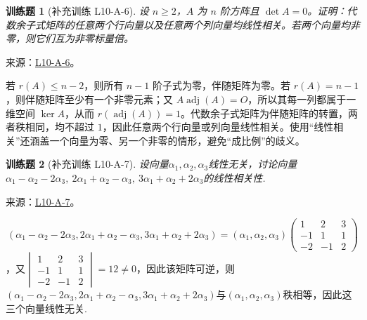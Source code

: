 \documentclass[12pt,fontset=fandol]{ctexart}
\newtheorem{exercise}{训练题}[section]
\begin{document}
\begin{exercise}[补充训练 L10-A-6]\label{prob:L10-A-6}
设 $n\ge2$，$A$ 为 $n$ 阶方阵且 $\det A=0$。证明：代数余子式矩阵的任意两个行向量以及任意两个列向量均线性相关。若两个向量均非零，则它们互为非零标量倍。
\end{exercise}
\noindent 来源：\href{https://github.com/yhwu-is/Linear-Algebra-Left-Undone/blob/new/%E8%AE%B2%E4%B9%89/%E4%B8%93%E9%A2%98/10%20%E8%A1%8C%E5%88%97%E5%BC%8F.tex}{L10-A-6}。
\begin{solve}
若 $r(A)\le n-2$，则所有 $n-1$ 阶子式为零，伴随矩阵为零。若 $r(A)=n-1$，则伴随矩阵至少有一个非零元素；又 $A\operatorname{adj}(A)=O$，所以其每一列都属于一维空间 $\ker A$，从而 $r(\operatorname{adj}(A))=1$。代数余子式矩阵为伴随矩阵的转置，两者秩相同，均不超过 $1$，因此任意两个行向量或列向量线性相关。使用“线性相关”还涵盖一个向量为零、另一个非零的情形，避免“成比例”的歧义。
\end{solve}

\begin{exercise}[补充训练 L10-A-7]\label{prob:L10-A-7}
设向量$\alpha_1,\alpha_2,\alpha_3$线性无关，讨论向量$\alpha_1-\alpha_2-2\alpha_3,\ 2\alpha_1+\alpha_2-\alpha_3,\ 3\alpha_1+\alpha_2+2\alpha_3$的线性相关性.
\end{exercise}
\noindent 来源：\href{https://github.com/yhwu-is/Linear-Algebra-Left-Undone/blob/new/%E8%AE%B2%E4%B9%89/%E4%B8%93%E9%A2%98/10%20%E8%A1%8C%E5%88%97%E5%BC%8F.tex}{L10-A-7}。
\begin{solve}
\[(\alpha_1-\alpha_2-2\alpha_3,2\alpha_1+\alpha_2-\alpha_3,3\alpha_1+\alpha_2+2\alpha_3)=(\alpha_1,\alpha_2,\alpha_3)\begin{pmatrix}
                1 & 2 & 3 \\ -1 & 1 & 1 \\ -2 & -1 & 2
            \end{pmatrix}\]
，又$\begin{vmatrix}
                1 & 2 & 3 \\ -1 & 1 & 1 \\ -2 & -1 & 2
            \end{vmatrix}=12\neq 0$，因此该矩阵可逆，则$(\alpha_1-\alpha_2-2\alpha_3,2\alpha_1+\alpha_2-\alpha_3,3\alpha_1+\alpha_2+2\alpha_3)$与$(\alpha_1,\alpha_2,\alpha_3)$秩相等，因此这三个向量线性无关.
\end{solve}
\end{document}

